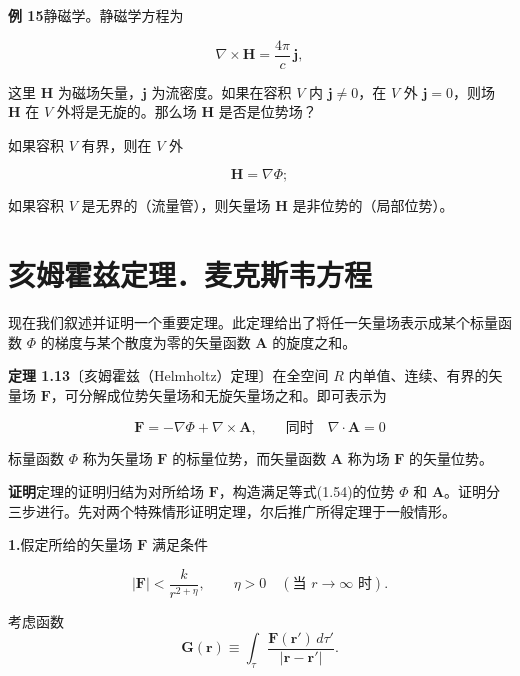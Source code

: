 \documentclass[11pt,a4paper,oneside]{ctexbook}
\newcommand{\ve}[1]{\bm{#1}}
\begin{document}
\textbf{例 15}\quad 静磁学。静磁学方程为

\begin{equation*}
\nabla \times \ve{H} = \frac{4\pi}{c}\, \ve{j},
\end{equation*}

这里 $\ve{H}$ 为磁场矢量，$\ve{j}$ 为流密度。如果在容积 $V$ 内 $\ve{j} \neq 0$，在 $V$ 外 $\ve{j} = 0$，则场 $\ve{H}$ 在 $V$ 外将是无旋的。那么场 $\ve{H}$ 是否是位势场？

如果容积 $V$ 有界，则在 $V$ 外

\begin{equation*}
\ve{H} = \nabla\Phi;
\end{equation*}

如果容积 $V$ 是无界的（流量管），则矢量场 $\ve{H}$ 是非位势的（局部位势）。

\section{亥姆霍兹定理．麦克斯韦方程}

现在我们叙述并证明一个重要定理。此定理给出了将任一矢量场表示成某个标量函数 $\Phi$ 的梯度与某个散度为零的矢量函数 $\ve{A}$ 的旋度之和。

\textbf{定理 1.13}〔亥姆霍兹（Helmholtz）定理〕\quad 在全空间 $R$ 内单值、连续、有界的矢量场 $\ve{F}$，可分解成位势矢量场和无旋矢量场之和。即可表示为

\begin{equation}
\ve{F} = -\nabla\Phi + \nabla \times \ve{A}, \qquad \text{同时} \quad \nabla \cdot \ve{A} = 0
\tag{1.54}
\end{equation}

标量函数 $\Phi$ 称为矢量场 $\ve{F}$ 的标量位势，而矢量函数 $\ve{A}$ 称为场 $\ve{F}$ 的矢量位势。

\textbf{证明}\quad 定理的证明归结为对所给场 $\ve{F}$，构造满足等式(1.54)的位势 $\Phi$ 和 $\ve{A}$。证明分三步进行。先对两个特殊情形证明定理，尔后推广所得定理于一般情形。

\textbf{1.}\quad 假定所给的矢量场 $\ve{F}$ 满足条件

\begin{equation}
|\ve{F}| < \frac{k}{r^{2+\eta}}, \qquad \eta > 0 \quad (\text{当 } r \to \infty \text{ 时}).
\tag{1.55}
\end{equation}

考虑函数
\begin{equation*}
\ve{G}(\ve{r}) \equiv \int_{\tau} \frac{\ve{F}(\ve{r}')\, d\tau'}{|\ve{r} - \ve{r}'|}.
\end{equation*}
\end{document}
